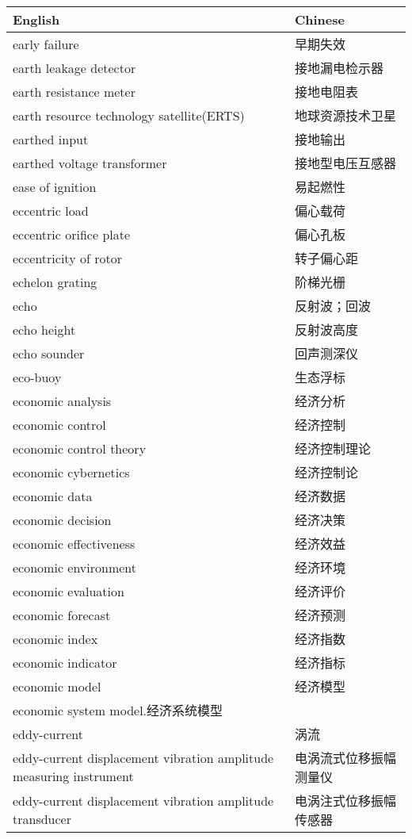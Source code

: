 \documentclass[
]{article}
\begin{document}
\begin{longtable}[]{@{}ll@{}}
\toprule()
English & Chinese \\
\midrule()
\endhead
early failure & 早期失效 \\
earth leakage detector & 接地漏电检示器 \\
earth resistance meter & 接地电阻表 \\
earth resource technology satellite(ERTS) & 地球资源技术卫星 \\
earthed input & 接地输出 \\
earthed voltage transformer & 接地型电压互感器 \\
ease of ignition & 易起燃性 \\
eccentric load & 偏心载荷 \\
eccentric orifice plate & 偏心孔板 \\
eccentricity of rotor & 转子偏心距 \\
echelon grating & 阶梯光栅 \\
echo & 反射波；回波 \\
echo height & 反射波高度 \\
echo sounder & 回声测深仪 \\
eco-buoy & 生态浮标 \\
economic analysis & 经济分析 \\
economic control & 经济控制 \\
economic control theory & 经济控制理论 \\
economic cybernetics & 经济控制论 \\
economic data & 经济数据 \\
economic decision & 经济决策 \\
economic effectiveness & 经济效益 \\
economic environment & 经济环境 \\
economic evaluation & 经济评价 \\
economic forecast & 经济预测 \\
economic index & 经济指数 \\
economic indicator & 经济指标 \\
economic model & 经济模型 \\
economic system model.经济系统模型 & \\
eddy-current & 涡流 \\
eddy-current displacement vibration amplitude measuring instrument &
电涡流式位移振幅测量仪 \\
eddy-current displacement vibration amplitude transducer &
电涡注式位移振幅传感器 \\

\end{longtable}
\end{document}
